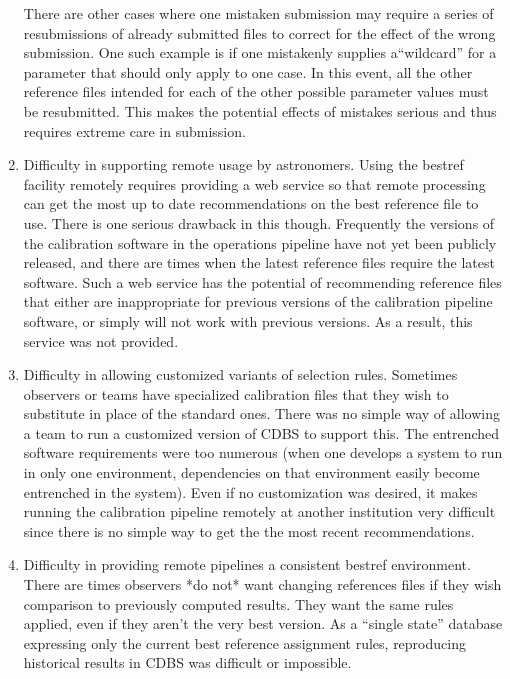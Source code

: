 \documentclass[final,authoryear,5p,times,twocolumn]{elsarticle}
\begin{document}
\begin{enumerate}
There are other cases where one mistaken submission may require a series of
resubmissions of already submitted files to correct for the effect of the wrong
submission. One such example is if one mistakenly supplies a``wildcard'' for a
parameter that should only apply to one case. In this event, all the other
reference files intended for each of the other possible parameter values must
be resubmitted. This makes the potential effects of mistakes serious and thus
requires extreme care in submission.

\item Difficulty in supporting remote usage by astronomers. 
Using the bestref facility remotely
requires providing a web service so that remote processing can get the most up
to date recommendations on the best reference file to use. There is one serious
drawback in this though. Frequently the versions of the calibration software in
the operations pipeline have not yet been publicly released, and there are
times when the latest reference files require the latest software. Such a web
service has the potential of recommending reference files that either are
inappropriate for previous versions of the calibration pipeline software, or
simply will not work with previous versions. As a result, this service was not
provided.

\item Difficulty in allowing customized variants of selection rules. Sometimes
observers or teams have specialized calibration files that they wish to
substitute in place of the standard ones. There was no simple way of allowing a
team to run a customized version of CDBS to support this. The entrenched
software requirements were too numerous (when one develops a system to run in
only one environment, dependencies on that environment easily become entrenched
in the system). Even if no customization was desired, it makes running the
calibration pipeline remotely at another institution very difficult since there
is no simple way to get the the most recent recommendations.

\item Difficulty in providing remote pipelines a consistent bestref
environment. There are times observers *do not* want changing references files
if they wish comparison to previously computed results. They want the same
rules applied, even if they aren't the very best version.
As a ``single state'' database expressing only the current best reference
assignment rules, reproducing historical results in CDBS was difficult or
impossible.


\end{enumerate}
\end{document}
